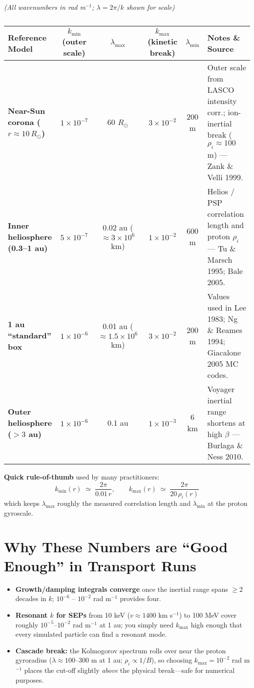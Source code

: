\noindent\textit{(All wavenumbers in rad m$^{-1}$; $\lambda = 2\pi / k$ shown for scale)}

\begin{table}[h!]
\centering
\begin{tabular}{|p{5cm}|c|c|c|c|p{7cm}|}
\hline
\textbf{Reference Model} & $k_{\min}$ (outer scale) & $\lambda_{\max}$ & $k_{\max}$ (kinetic break) & $\lambda_{\min}$ & \textbf{Notes \& Source} \\
\hline
\textbf{Near-Sun corona ($r \approx 10\,R_{\odot}$)} & $1 \times 10^{-7}$ & 60 $R_{\odot}$ & $3 \times 10^{-2}$ & 200 m & Outer scale from LASCO intensity corr.; ion-inertial break ($\rho_i \approx 100$ m) --- Zank \& Velli 1999. \\
\hline
\textbf{Inner heliosphere (0.3--1 au)} & $5 \times 10^{-7}$ & 0.02 au ($\approx 3 \times 10^6$ km) & $1 \times 10^{-2}$ & 600 m & Helios / PSP correlation length and proton $\rho_i$ --- Tu \& Marsch 1995; Bale 2005. \\
\hline
\textbf{1 au ``standard'' box} & $1 \times 10^{-6}$ & 0.01 au ($\approx 1.5 \times 10^6$ km) & $3 \times 10^{-2}$ & 200 m & Values used in Lee 1983; Ng \& Reames 1994; Giacalone 2005 MC codes. \\
\hline
\textbf{Outer heliosphere ($>3$ au)} & $1 \times 10^{-6}$ & 0.1 au & $1 \times 10^{-3}$ & 6 km & Voyager inertial range shortens at high $\beta$ --- Burlaga \& Ness 2010. \\
\hline
\end{tabular}
\caption*{}
\end{table}

\noindent\textbf{Quick rule-of-thumb} used by many practitioners:
\begin{equation*}
k_{\min}(r) \;\simeq\; \frac{2\pi}{0.01\,r}, \qquad
k_{\max}(r) \;\simeq\; \frac{2\pi}{20\,\rho_i(r)}
\end{equation*}
which keeps $\lambda_{\max}$ roughly the measured correlation length and $\lambda_{\min}$ at the proton gyroscale.

\section*{Why These Numbers are ``Good Enough'' in Transport Runs}

\begin{itemize}
    \item \textbf{Growth/damping integrals converge} once the inertial range spans $\geq$2 decades in $k$; $10^{-6}$ -- $10^{-2}$ rad m$^{-1}$ provides four.
    \item \textbf{Resonant $k$ for SEPs} from 10 keV ($v \approx 1400$ km s$^{-1}$) to 100 MeV cover roughly $10^{-5}$--$10^{-2}$ rad m$^{-1}$ at 1 au; you simply need $k_{\max}$ high enough that every simulated particle can find a resonant mode.
    \item \textbf{Cascade break:} the Kolmogorov spectrum rolls over near the proton gyroradius ($\lambda \approx 100$--300 m at 1 au; $\rho_i \propto 1/B$), so choosing $k_{\max} = 10^{-2}$ rad m$^{-1}$ places the cut-off slightly \textit{above} the physical break---safe for numerical purposes.
\end{itemize}


